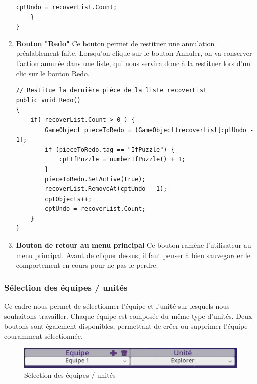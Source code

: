 \documentclass{report}
\begin{document}
\begin{enumerate}[label=\Alph*)]
\begin{lstlisting}[language={[Sharp]C},label={lst:Undo()()}, caption= Extrait du code de createPuzzle.cs]
        cptUndo = recoverList.Count;
    }
}
\end{lstlisting}	
\item\textbf{Bouton "Redo"} \newline
Ce bouton permet de restituer une annulation préalablement faite. Lorsqu'on clique sur le bouton Annuler, on va conserver l'action annulée dans une liste, qui nous servira donc à la restituer lors d'un clic sur le bouton Redo.
\begin{lstlisting}[language={[Sharp]C},label={lst:Redo()}, caption= Extrait du code de createPuzzle.cs]
// Restitue la dernière pièce de la liste recoverList
public void Redo()
{
    if( recoverList.Count > 0 ) {
        GameObject pieceToRedo = (GameObject)recoverList[cptUndo - 1];
        if (pieceToRedo.tag == "IfPuzzle") {
            cptIfPuzzle = numberIfPuzzle() + 1;
        }
        pieceToRedo.SetActive(true);
        recoverList.RemoveAt(cptUndo - 1);
        cptObjects++;
        cptUndo = recoverList.Count;        
    }
}
\end{lstlisting}	
\item\textbf{Bouton de retour au menu principal} \newline
Ce bouton ramène l'utilisateur au menu principal. Avant de cliquer dessus, il faut penser à bien sauvegarder le comportement en cours pour ne pas le perdre.
\end{enumerate}




\subsubsection{Sélection des équipes / unités}
Ce cadre nous permet de sélectionner l'équipe et l'unité sur lesquels nous souhaitons travailler.
Chaque équipe est composée du même type d'unités. Deux boutons sont également disponibles, permettant de créer ou supprimer l'équipe couramment sélectionnée.
\begin{figure}[!h]
	\centering
		\includegraphics[scale=1]{SelectionTeamUnit}
	\caption{Sélection des équipes / unités}
\end{figure}
\end{document}
